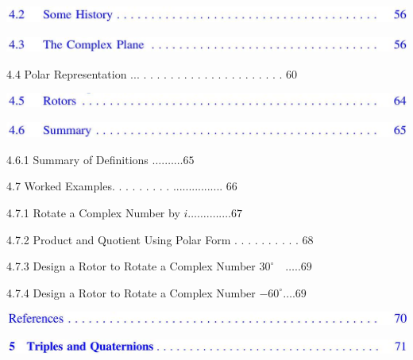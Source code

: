 \documentclass[10pt]{article}
\begin{document}
\begin{center}
\includegraphics[max width=\textwidth]{2023_04_20_41f1ceac5a31dc7d1b59g-011(1)}
\end{center}

\begin{center}
\includegraphics[max width=\textwidth]{2023_04_20_41f1ceac5a31dc7d1b59g-011(16)}
\end{center}

4.4 Polar Representation ... . . . . . . . . . . . . . . . . . . . . . 60

\begin{center}
\includegraphics[max width=\textwidth]{2023_04_20_41f1ceac5a31dc7d1b59g-011(5)}
\end{center}

\begin{center}
\includegraphics[max width=\textwidth]{2023_04_20_41f1ceac5a31dc7d1b59g-011(11)}
\end{center}

4.6.1 Summary of Definitions $\ldots . \ldots \ldots 65$

4.7 Worked Examples. . . . . . . . . ................ 66

4.7.1 Rotate a Complex Number by $i \ldots \ldots . \ldots . \ldots 67$

4.7.2 Product and Quotient Using Polar Form . . . . . . . . . . 68

4.7.3 Design a Rotor to Rotate a Complex Number $30^{\circ} \quad \ldots . .69$

4.7.4 Design a Rotor to Rotate a Complex Number $-60^{\circ} \ldots .69$

\begin{center}
\includegraphics[max width=\textwidth]{2023_04_20_41f1ceac5a31dc7d1b59g-011}
\end{center}

\begin{center}
\includegraphics[max width=\textwidth]{2023_04_20_41f1ceac5a31dc7d1b59g-011(3)}
\end{center}
\end{document}
